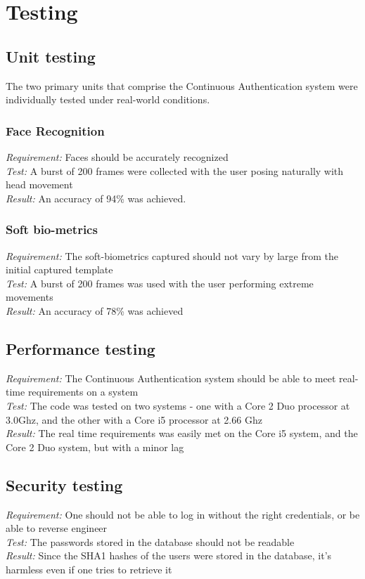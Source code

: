 \documentclass[12pt]{article}			%
\begin{document}
\section{ Testing }

\subsection{ Unit testing }
The two primary units that comprise the Continuous Authentication system were individually tested under real-world conditions.

\subsubsection{ Face Recognition }
\emph{ Requirement: } Faces should be accurately recognized\\
\emph{ Test: } A burst of 200 frames were collected with the user posing naturally with head movement\\
\emph{ Result: } An accuracy of 94\% was achieved.\\

\subsubsection{ Soft bio-metrics }
\emph{ Requirement: } The soft-biometrics captured should not vary by large from the initial captured template\\
\emph{ Test: } A burst of 200 frames was used with the user performing extreme movements\\
\emph{ Result: } An accuracy of 78\% was achieved\\

\subsection{ Performance testing } 
\emph{ Requirement: } The Continuous Authentication system should be able to meet real-time requirements on a system\\
\emph{ Test: } The code was tested on two systems - one with a Core 2 Duo processor at 3.0Ghz, and the other with a Core i5 processor at 2.66 Ghz\\
\emph{ Result: } The real time requirements was easily met on the Core i5 system, and the Core 2 Duo system, but with a minor lag\\

\subsection{ Security testing}
\emph{ Requirement: } One should not be able to log in without the right credentials, or be able to reverse engineer\\
\emph{ Test: } The passwords stored in the database should not be readable\\
\emph{ Result: } Since the SHA1 hashes of the users were stored in the database, it's harmless even if one tries to retrieve it\\
\end{document}
